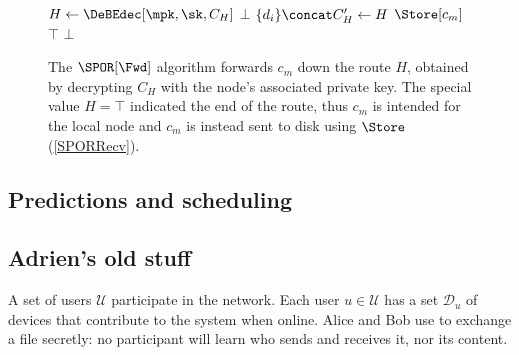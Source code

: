 \begin{figure}
  \begin{algorithmic}
      \State $H\gets \DeBEdec[\mpk, \sk, C_H]$
        \State \Return $\bot$
      \EndIf
      \State $\{d_i\}\concat C_H'\gets H$
        \State \Return $\Store[c_m]$
      \EndIf
          \State \Return $\top$
        \EndIf
      \EndFor
      \State \Return $\bot$
    \EndFunction
  \end{algorithmic}
  \caption{\label{SPORFwd}%
    The \(\SPOR[\Fwd]\) algorithm forwards \(c_m\) down the route \(H\), 
    obtained by decrypting \(C_H\) with the node's associated private key.%
    The special value \(H = \top\) indicated the end of the route, thus \(c_m\) 
    is intended for the local node and \(c_m\) is instead sent to disk using 
    \(\Store\) (\cref{SPORRecv}).%
  }
\end{figure}

\subsection{Predictions and scheduling}




\subsection{Adrien's old stuff}

A set of users $\mathcal{U}$ participate in the \name network.
Each user $u \in \mathcal{U}$ has a set $\mathcal{D}_u$ of devices that contribute to the system when online.
Alice and Bob use \name to exchange a file secretly: no participant will learn who sends and receives it, nor its content.

